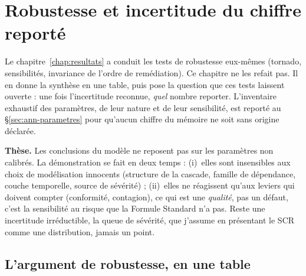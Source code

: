 \chapter{Robustesse et incertitude du chiffre reporté}
\label{ch:robustesse}

\noindent Le chapitre~\ref{chap:resultats} a conduit les tests de robustesse eux-mêmes
(tornado, sensibilités, invariance de l'ordre de remédiation). Ce chapitre ne les refait pas.
Il en donne la synthèse en une table, puis pose la question que ces tests laissent ouverte :
une fois l'incertitude reconnue, \emph{quel} nombre reporter. L'inventaire exhaustif des
paramètres, de leur nature et de leur sensibilité, est reporté au \S\ref{sec:ann-parametres}
pour qu'aucun chiffre du mémoire ne soit sans origine déclarée.

\begin{cle}
\textbf{Thèse.} Les conclusions du modèle ne reposent pas sur les paramètres non calibrés.
La démonstration se fait en deux temps : (i)~elles sont insensibles aux choix de modélisation
innocents (structure de la cascade, famille de dépendance, couche temporelle, source de
sévérité) ; (ii)~elles ne réagissent qu'aux leviers qui doivent compter (conformité,
contagion), ce qui est une \emph{qualité}, pas un défaut, c'est la sensibilité au risque que
la Formule Standard n'a pas. Reste une incertitude irréductible, la queue de sévérité, que
j'assume en présentant le SCR comme une distribution, jamais un point.
\end{cle}

\section{L'argument de robustesse, en une table}

